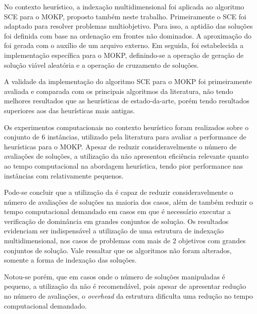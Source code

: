 No contexto heurístico, a indexação multidimensional
foi aplicada ao algoritmo SCE para o MOKP, proposto também neste trabalho.
Primeiramente o SCE foi adaptado para resolver problemas multiobjetivo.
Para isso, a aptidão das soluções foi definida com base na ordenação
em frontes não dominados.
A aproximação do \paretoset{} foi gerada com o auxílio de um arquivo externo.
Em seguida, foi estabelecida a implementação específica para o MOKP,
definindo-se a operação de geração de solução viável
aleatória e a operação de cruzamento de soluções.

A validade da implementação do algoritmo SCE para o MOKP foi primeiramente
avaliada e comparada com os principais algoritmos da literatura,
não tendo melhores resultados que as
heurísticas de estado-da-arte, porém tendo resultados superiores aos
das heurísticas mais antigas.

Os experimentos computacionais no contexto heurístico
foram realizados sobre o conjunto de 6 instâncias,
utilizado pela literatura para avaliar a performance de heurísticas para o MOKP.
Apesar de reduzir consideravelmente o número de avaliações de soluções,
a utilização da \kdtree{} não apresentou eficiência relevante quanto ao tempo computacional
na abordagem heurística, tendo pior performance nas instâncias com \paretoset{}
relativamente pequenos.

Pode-se concluir que a utilização da \kdtree{} é capaz de reduzir consideravelmente
o número de avaliações de soluções na maioria dos casos, além de também reduzir o tempo computacional
demandado em casos em que é necessário executar a verificação de dominância em grandes
conjuntos de solução.
Os resultados evidenciam ser indispensável
a utilização de uma estrutura de indexação multidimensional,
nos casos de problemas com mais de 2 objetivos com grandes
conjuntos de solução.
Vale ressaltar que os algoritmos não foram alterados, somente
a forma de indexação das soluções.

%

Notou-se porém, que em casos onde o número de soluções manipuladas é pequeno, a utilização
da \kdtree{} não é recomendável, pois apesar de apresentar redução no número de
avaliações, o \emph{overhead} da estrutura dificulta uma redução no tempo computacional demandado.

